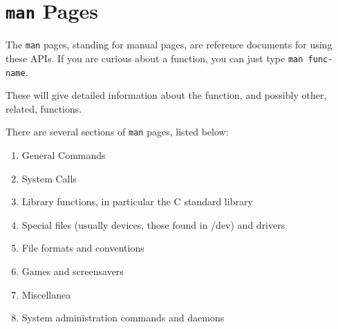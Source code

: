 \section{\texttt{man} Pages}\label{sec:Man_Pages}
The \texttt{man} pages, standing for manual pages, are reference documents for using these APIs.
If you are curious about a function, you can just type \texttt{man func-name}.

These will give detailed information about the function, and possibly other, related, functions.

There are several sections of \texttt{man} pages, listed below:
\begin{enumerate}[noitemsep]
\item General Commands
\item System Calls
\item Library functions, in particular the C standard library
\item Special files (usually devices, those found in /dev) and drivers
\item File formats and conventions
\item Games and screensavers
\item Miscellanea
\item System administration commands and daemons
\end{enumerate}

